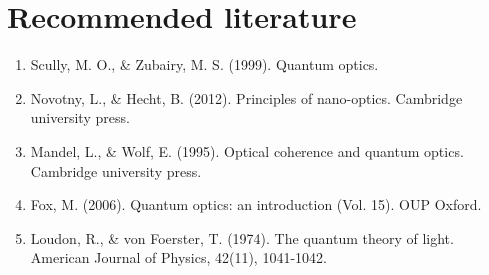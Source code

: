 \section*{Recommended literature}

\begin{enumerate}
	\item Scully, M. O., \& Zubairy, M. S. (1999). Quantum optics.
	\item Novotny, L., \& Hecht, B. (2012). Principles of nano-optics. Cambridge university press.
	\item Mandel, L., \& Wolf, E. (1995). Optical coherence and quantum optics. Cambridge university press.
	\item Fox, M. (2006). Quantum optics: an introduction (Vol. 15). OUP Oxford.
	\item Loudon, R., \& von Foerster, T. (1974). The quantum theory of light. American Journal of Physics, 42(11), 1041-1042.
\end{enumerate}